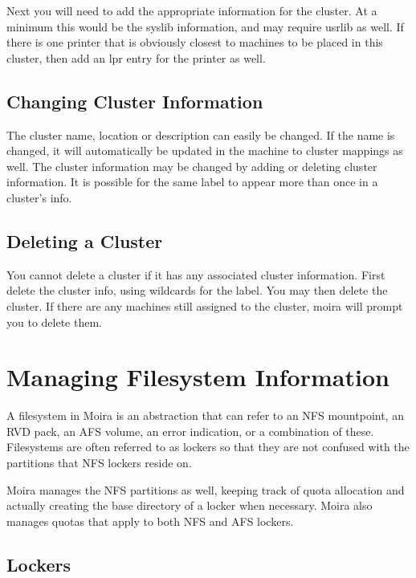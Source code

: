\documentclass{book}
\begin{document}
Next you will need to add the appropriate information for the cluster.
At a minimum this would be the syslib information, and may require
usrlib as well.  If there is one printer that is obviously closest to
machines to be placed in this cluster, then add an lpr entry for the
printer as well.  

\subsection{Changing Cluster Information}
The cluster name, location or description can easily be changed.  If
the name is changed, it will automatically be updated in the machine
to cluster mappings as well.  The cluster information may be changed
by adding or deleting cluster information.  It is possible for the
same label to appear more than once in a cluster's info.

\subsection{Deleting a Cluster}
You cannot delete a cluster if it has any associated cluster
information.   First delete the cluster info, using wildcards for the
label.  You may then delete the cluster.  If there are any machines
still assigned to the cluster, moira will prompt you to delete them.

\section{Managing Filesystem Information}

A filesystem in Moira is an abstraction that can refer to an NFS
mountpoint, an RVD pack, an AFS volume, an error indication, or a
combination of these.  Filesystems are often referred to as lockers so
that they are not confused with the partitions that NFS lockers reside
on.

Moira manages the NFS partitions as well, keeping track of quota
allocation and actually creating the base directory of a locker when
necessary.  Moira also manages quotas that apply to both NFS and AFS
lockers.

\subsection{Lockers}
\end{document}
